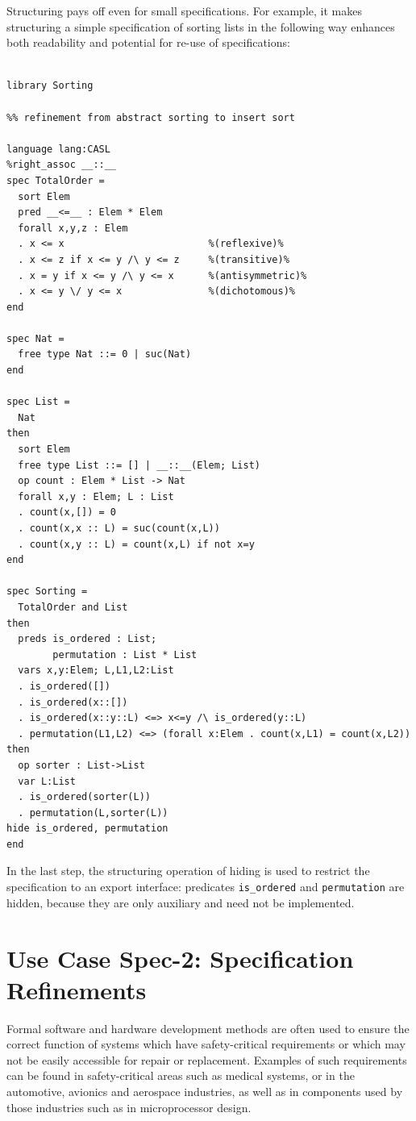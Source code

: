 \documentclass[10pt,fleqn,final]{scrreprt}
\newenvironment{definitions}[0]{\medskip }{}
\begin{document}
\begin{definitions}
Structuring pays off even for small specifications. For example, it makes
structuring a simple specification of sorting lists in the 
following way enhances both readability and potential for re-use
of specifications:

\begin{lstlisting}[basicstyle=\ttfamily\footnotesize,language=dolText,morekeywords={sort, ops, refinement, free,spec type, assoc, unit,props,op,spec,refined, via,generated, then,ObjectProperty,Class,DisjointUnionOf,SubClassOf,Characteristics,Transitive,Asymmetric,SubPropertyOf,DisjointClasses,EquivalentTo,inverse,only,forall,iff,if,or,exists,distributed,from},escapechar=@,mathescape]	
%prefix( lang:  <http://purl.net/DOL/languages/> )%

library Sorting

%% refinement from abstract sorting to insert sort

language lang:CASL
%right_assoc __::__
spec TotalOrder =
  sort Elem
  pred __<=__ : Elem * Elem
  forall x,y,z : Elem
  . x <= x                         %(reflexive)%
  . x <= z if x <= y /\ y <= z     %(transitive)%
  . x = y if x <= y /\ y <= x      %(antisymmetric)%
  . x <= y \/ y <= x               %(dichotomous)%
end

spec Nat =
  free type Nat ::= 0 | suc(Nat)
end

spec List =
  Nat
then
  sort Elem
  free type List ::= [] | __::__(Elem; List)
  op count : Elem * List -> Nat
  forall x,y : Elem; L : List
  . count(x,[]) = 0
  . count(x,x :: L) = suc(count(x,L))
  . count(x,y :: L) = count(x,L) if not x=y
end

spec Sorting =
  TotalOrder and List
then
  preds is_ordered : List;
        permutation : List * List
  vars x,y:Elem; L,L1,L2:List
  . is_ordered([])
  . is_ordered(x::[])
  . is_ordered(x::y::L) <=> x<=y /\ is_ordered(y::L)
  . permutation(L1,L2) <=> (forall x:Elem . count(x,L1) = count(x,L2))
then
  op sorter : List->List
  var L:List
  . is_ordered(sorter(L))
  . permutation(L,sorter(L))
hide is_ordered, permutation
end
\end{lstlisting}

In the last step, the structuring operation of hiding is used to
restrict the specification to an export interface: 
 predicates \texttt{is\_ordered} and \texttt{permutation} are hidden, because they
are only auxiliary and need not be implemented.


\section{Use Case Spec-2: Specification Refinements}\label{spec-2}
Formal software and hardware development methods are often used to
ensure the correct function of systems which have safety-critical
requirements or which may not be easily accessible for repair or
replacement.  Examples of such requirements can be found in
safety-critical areas such as medical systems, or in the automotive,
avionics and aerospace industries, as well as in components used by
those industries such as in microprocessor design.


\end{definitions}
\end{document}
